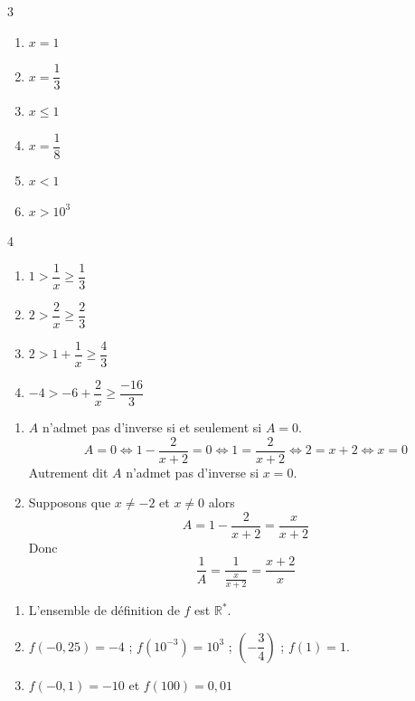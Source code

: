 \documentclass[french]{book}
\begin{document}
\begin{corrige}
\begin{multicols}{3}
\begin{enumerate}
\item $x=1$
\item $x=\dfrac{1}{3}$
\item $x \leq 1$
\item $x=\dfrac{1}{8}$
\item $x<1$
\item $x>10^3$
\end{enumerate}
\end{multicols}
\end{corrige}

\begin{corrige}
\begin{multicols}{4}
\begin{enumerate}
\item $1 > \dfrac{1}{x} \geq \dfrac{1}{3}$
\item $2 > \dfrac{2}{x} \geq \dfrac{2}{3}$
\item $2 >1+\dfrac{1}{x} \geq \dfrac{4}{3} $
\item $-4 >-6+\dfrac{2}{x} \geq \dfrac{-16}{3}$
\end{enumerate}
\end{multicols}
\end{corrige}

\begin{corrige}
\begin{enumerate}
\item $A$ n'admet pas d'inverse si et seulement si $A=0$. 
$$A=0 \Longleftrightarrow 1-\dfrac{2}{x+2} =0 \Longleftrightarrow 1=\dfrac{2}{x+2} \Longleftrightarrow 2=x+2 \Longleftrightarrow x=0$$
Autrement dit $A$ n'admet pas d'inverse si $x=0$. 
\item Supposons que $x \neq -2$ et $x\neq 0$ alors 
$$A=1-\dfrac{2}{x+2}=\dfrac{x}{x+2}$$
Donc 
$$\dfrac{1}{A}=\dfrac{1}{\frac{x}{x+2}}=\dfrac{x+2}{x}$$

\end{enumerate}
\end{corrige}

\begin{corrige}
\begin{enumerate}
\item L'ensemble de définition de $f$ est  $\mathbb{R}^*$.
\item $f(-0,25)=-4$ ; $f(10^{-3})=10^3$ ; $(-\dfrac{3}{4})$ ; $f(1)=1$.
\item $f(-0,1)=-10$ et $f(100)=0,01$
\end{enumerate}
\end{corrige}
\end{document}

